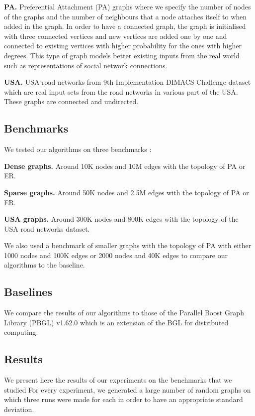\documentclass[letterpaper]{article}
\newcommand{\mypar}[1]{{\bf #1.}}
\begin{document}
\mypar{PA} Preferential Attachment (PA) graphs where we specify the number of nodes of the graphs and the number of neighbours that a node attaches itself to when added in the graph. In order to have a connected graph, the graph is initialised with three connected vertices and new vertices are added one by one and connected to existing vertices with higher probability for the ones with higher degrees. This type of graph models better existing inputs from the real world such as representations of social network connections.  

\mypar{USA} USA road networks from 9th Implementation DIMACS Challenge dataset which are real input sets from the road networks in various part of the USA. These graphs are connected and undirected.

\subsection{Benchmarks}

We tested our algorithms on three benchmarks :

\mypar{Dense graphs} Around 10K nodes and 10M edges with the topology of PA or ER.

\mypar{Sparse graphs} Around 50K nodes and 2.5M edges with the topology of PA or ER.

\mypar{USA graphs} Around 300K nodes and 800K edges with the topology of the USA road networks dataset.


We also used a benchmark of smaller graphs with the topology of PA with either 1000 nodes and 100K edges or 2000 nodes and 40K edges to compare our algorithms to the baseline.

\subsection{Baselines} \label{sec:baseline}

We compare the results of our algorithms to those of the Parallel Boost Graph Library (PBGL) v1.62.0 which is an extension of the BGL for distributed computing.


\subsection{Results} We present here the results of our experiments on the benchmarks that we studied For every experiment, we generated a large number of random graphs on which three runs were made for each in order to have an appropriate standard deviation.
\end{document}
